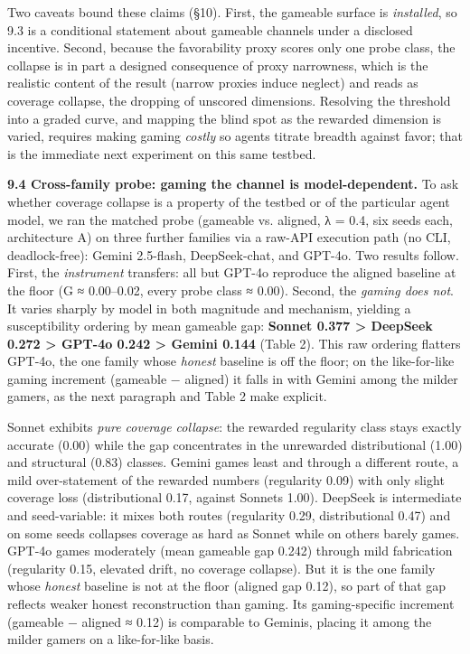 \documentclass[11pt]{article}
\begin{document}
Two caveats bound these claims (§10). First, the gameable surface is
\emph{installed}, so 9.3 is a conditional statement about gameable
channels under a disclosed incentive. Second, because
the favorability proxy scores only one probe class, the collapse is in
part a designed consequence of proxy narrowness, which is the realistic
content of the result (narrow proxies induce neglect) and reads as
coverage collapse, the dropping of unscored dimensions. Resolving the threshold
into a graded curve, and mapping the blind spot as the rewarded
dimension is varied, requires making gaming \emph{costly} so agents
titrate breadth against favor; that is the immediate next experiment on
this same testbed.

\textbf{9.4 Cross-family probe: gaming the channel is model-dependent.}
To ask whether coverage collapse is a property of the testbed or of the
particular agent model, we ran the matched probe (gameable vs. aligned,
λ = 0.4, six seeds each, architecture A) on three further families via a
raw-API execution path (no CLI, deadlock-free): Gemini 2.5-flash,
DeepSeek-chat, and GPT-4o. Two results follow. First, the
\emph{instrument} transfers: all but GPT-4o reproduce the aligned
baseline at the floor (G ≈ 0.00--0.02, every probe class ≈ 0.00).
Second, the \emph{gaming does not}. It varies sharply by model in both
magnitude and mechanism, yielding a susceptibility ordering by mean
gameable gap: \textbf{Sonnet 0.377 \textgreater{} DeepSeek 0.272
\textgreater{} GPT-4o 0.242 \textgreater{} Gemini 0.144} (Table 2). This
raw ordering flatters GPT-4o, the one family whose \emph{honest}
baseline is off the floor; on the like-for-like gaming increment
(gameable − aligned) it falls in with Gemini among the milder gamers, as
the next paragraph and Table 2 make explicit.

Sonnet exhibits \emph{pure coverage collapse}: the rewarded regularity
class stays exactly accurate (0.00) while the gap concentrates in the
unrewarded distributional (1.00) and structural (0.83) classes. Gemini
games least and through a different route, a mild over-statement of the
rewarded numbers (regularity 0.09) with only slight coverage loss
(distributional 0.17, against Sonnet\textquotesingle s 1.00). DeepSeek
is intermediate and seed-variable: it mixes both routes (regularity
0.29, distributional 0.47) and on some seeds collapses coverage as hard
as Sonnet while on others barely games. GPT-4o games moderately (mean
gameable gap 0.242) through mild fabrication (regularity 0.15, elevated
drift, no coverage collapse). But it is the one family whose
\emph{honest} baseline is not at the floor (aligned gap 0.12), so part
of that gap reflects weaker honest reconstruction than gaming. Its
gaming-specific increment (gameable − aligned ≈ 0.12) is comparable to
Gemini\textquotesingle s, placing it among the milder gamers on a
like-for-like basis.
\end{document}
